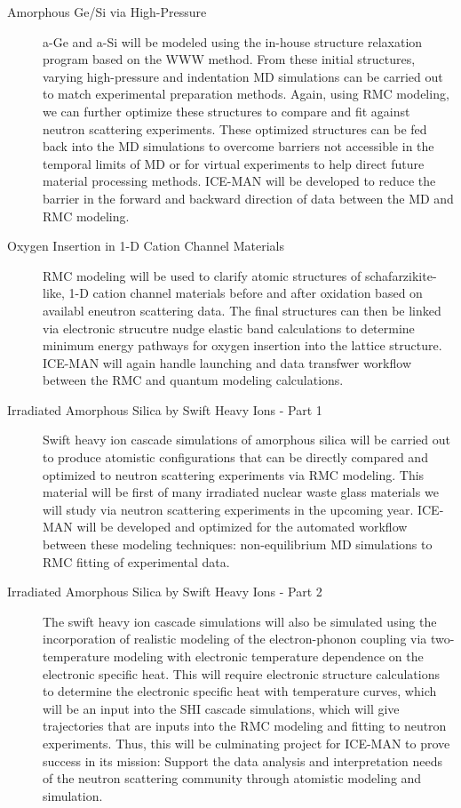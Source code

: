 \documentclass{proposalnsf}
\begin{document}
\begin{description}


\item[Amorphous Ge/Si via High-Pressure] a-Ge and a-Si will be modeled using the in-house structure relaxation program based on the WWW method. From these initial structures, varying high-pressure and indentation MD simulations can be carried out to match experimental preparation methods. Again, using RMC modeling, we can further optimize these structures to compare and fit against neutron scattering experiments. These optimized structures can be fed back into the MD simulations to overcome barriers not accessible in the temporal limits of MD or for virtual experiments to help direct future material processing methods. ICE-MAN will be developed to reduce the barrier in the forward and backward direction of data between the MD and RMC modeling.

\item[Oxygen Insertion in 1-D Cation Channel Materials]  RMC modeling will be used to clarify atomic structures of schafarzikite-like, 1-D cation channel materials before and after oxidation based on availabl eneutron scattering data. The final structures can then be linked via electronic strucutre nudge elastic band calculations to determine minimum energy pathways for oxygen insertion into the lattice structure. ICE-MAN will again handle launching and data transfwer workflow between the RMC and quantum modeling calculations.

\item[Irradiated Amorphous Silica by Swift Heavy Ions - Part 1] Swift heavy ion cascade simulations of amorphous silica will be carried out to produce atomistic configurations that can be directly compared and optimized to neutron scattering experiments via RMC modeling. This material will be first of many irradiated nuclear waste glass materials we will study via neutron scattering experiments in the upcoming year. ICE-MAN will be developed and optimized for the automated workflow between these modeling techniques: non-equilibrium MD simulations to RMC fitting of experimental data.

\item[Irradiated Amorphous Silica by Swift Heavy Ions - Part 2] The swift heavy ion cascade simulations will also be simulated using the incorporation of realistic modeling of the electron-phonon coupling via two-temperature modeling with electronic temperature dependence on the electronic specific heat. This will require electronic structure calculations to determine the electronic specific heat with temperature curves, which will be an input into the SHI cascade simulations, which will give trajectories that are inputs into the RMC modeling and fitting to neutron experiments. Thus, this will be culminating project for ICE-MAN to prove success in its mission: Support the data analysis and interpretation needs of the neutron scattering community through atomistic modeling and simulation. \

\end{description} 
\end{document}
